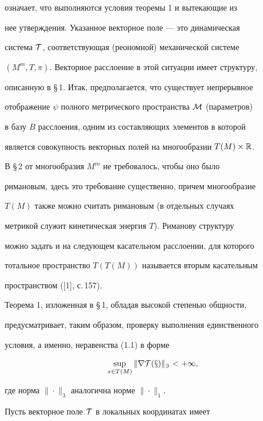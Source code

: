 означает, что выполняются условия теоремы 1 и вытекающие из 


нее утверждения. Указанное векторное поле --- это динамическая 


система $\cal T$, соответствующая (реономной) механической системе 


$(M^m,T,\pi)$. Векторное расслоение в этой ситуации имеет структуру, 


описанную в \S\,1. Итак, предполагается, что существует непрерывное 


отображение $\psi$ полного метрического пространства $\cal M$ (параметров) 


в базу $B$ расслоения, одним из составляющих элементов в которой 


является совокупность векторных полей на многообразии $T(M)\times\Bbb R$. 


 


В \S\,2 от многообразия $M^m$ не требовалось, чтобы оно было 


римановым, здесь это требование существенно, причем многообразие 


$T(M)$ также можно считать римановым (в отдельных случаях 


метрикой служит кинетическая энергия $T$). Риманову структуру 


можно задать и на следующем касательном расслоении, для которого 


тотальное пространство $T(T(M))$ называется вторым касательным 


пространством ([1], с.\,157). 


 


Теорема 1, изложенная в \S\,1, обладая высокой степенью общности, 


предусматривает, таким образом, проверку выполнения единственного 


условия, а именно, неравенства (1.1) в форме 


\begin{equation} 


\sup_{x\in T(M)}\|\nabla\cal T(x)\|_3<+\infty, 


\end{equation} 


где норма $\|\cdot\|_3$ аналогична норме $\|\cdot\|_1$. 


 


Пусть векторное поле $\cal T$ в локальных координатах имеет 


